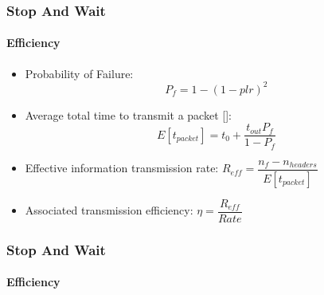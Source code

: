 


\begin{frame}		
	\frametitle{Stop And Wait}
	\framesubtitle{Efficiency}
	\begin{itemize}
		\item Probability of Failure\footnotemark:
			$$P_f = 1 - (1-plr)^2$$
		\item Average total time to transmit a packet [\cite{1}]:
			$$E[t_{packet}] = t_0 + \dfrac{t_{out} P_{f}}{1-P_{f}}$$
		\item Effective information transmission rate: $R_{eff} =\dfrac{n_f - n_{headers}}{E[t_{packet}]}$
		\item Associated transmission efficiency: $\eta = \dfrac{R_{eff}}{Rate}$
		

	\end{itemize}
\end{frame}


\begin{frame}		
	\frametitle{Stop And Wait}
	\framesubtitle{Efficiency}

\begin{columns}
	\begin{column}{0.5\textwidth}  %
	\begin{center}
		\begin{figure}[H]
		\end{figure}
	\end{center}
	\centering 
\end{column}
	\begin{column}{0.5\textwidth}  %
		\begin{center}
			\begin{figure}[H]
			\end{figure}
		\end{center}
		\centering 
	\end{column}
\end{columns}


\end{frame}

